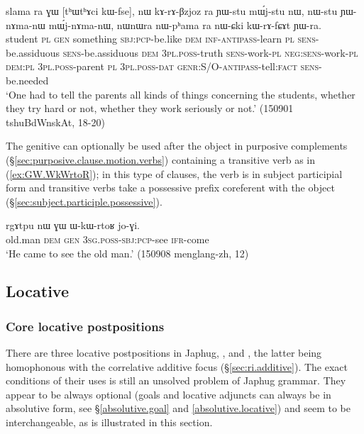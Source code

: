 \begin{exe}
\ex \label{ex:slama.ra.GW}
\gll  slama ra ɣɯ [tʰɯtʰɤci kɯ-fse], nɯ kɤ-rɤ-βzjoz ra ɲɯ-stu mɯ́j-stu nɯ, nɯ-stu ɲɯ-nɤma-nɯ mɯ́j-nɤma-nɯ,  nɯnɯra nɯ-pʰama ra nɯ-ɕki kɯ-rɤ-fɕɤt ɲɯ-ra. \\
student \textsc{pl} \textsc{gen} something \textsc{sbj}:\textsc{pcp}-be.like \textsc{dem}  \textsc{inf}-\textsc{antipass}-learn \textsc{pl} \textsc{sens}-be.assiduous \textsc{sens}-be.assiduous \textsc{dem} \textsc{3pl}.\textsc{poss}-truth \textsc{sens}-work-\textsc{pl} \textsc{neg}:\textsc{sens}-work-\textsc{pl} \textsc{dem}:\textsc{pl} \textsc{3pl}.\textsc{poss}-parent \textsc{pl} \textsc{3pl}.\textsc{poss}-\textsc{dat} \textsc{genr}:S/O-\textsc{antipass}-tell:\textsc{fact} \textsc{sens}-be.needed \\
\glt `One had to tell the parents all kinds of things concerning the students, whether they try hard or not, whether they work seriously or not.' (150901 tshuBdWnskAt, 18-20)
\end{exe}

The genitive  can optionally be used after the object in purposive complements (§\ref{sec:purposive.clause.motion.verbs}) containing a transitive verb as in (\ref{ex:GW.WkWrtoR}); in this type of clauses, the verb is in subject participial form and transitive verbs take a possessive prefix coreferent with the object (§\ref{sec:subject.participle.possessive}).

\begin{exe}
\ex \label{ex:GW.WkWrtoR}
\gll rgɤtpu nɯ ɣɯ ɯ-kɯ-rtoʁ jo-ɣi. \\
old.man \textsc{dem} \textsc{gen} \textsc{3sg}.\textsc{poss}-\textsc{sbj}:\textsc{pcp}-see \textsc{ifr}-come \\
\glt `He came to see the old man.' (150908 menglang-zh, 12)
\end{exe}

\subsection{Locative} \label{sec:locative}
 

\subsubsection{Core locative postpositions} \label{sec:core.locative}
There are three locative postpositions in Japhug, ,  and , the latter being homophonous with the correlative additive focus  (§\ref{sec:ri.additive}). The exact conditions of their uses is still an unsolved problem of Japhug grammar. They appear to be always optional (goals and locative adjuncts can always be in absolutive form, see §\ref{absolutive.goal}  and \ref{absolutive.locative}) and seem to be interchangeable, as is illustrated in this section.

